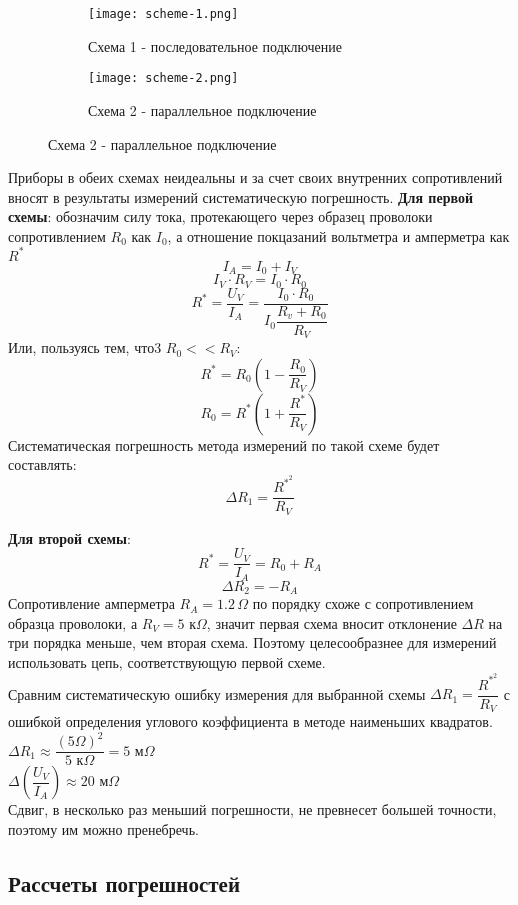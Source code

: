 \documentclass[12pt]{article}
\begin{document}
\begin{thebibliography}
\begin{figure}[H]
\begin{subfigure}{0.4\textwidth}
    \texttt{[image: scheme-1.png]}
    \large
    
    \caption*{Схема 1 - последовательное подключение}
    \label{fig: Схема 1}
    \end{subfigure}
    \begin{subfigure}{0.37\textwidth}
    \centering
    \texttt{[image: scheme-2.png]}
    \large
    \caption*{Схема 2 - параллельное подключение}
    \label{fig: Схема 2}
    \end{subfigure}
\end{figure}

Приборы в обеих схемах неидеальны и за счет своих внутренних сопротивлений вносят в результаты измерений систематическую погрешность. 
\textbf{Для первой схемы}: обозначим силу тока, протекающего через образец проволоки сопротивлением $R_0$ как $I_0$, а отношение покцазаний вольтметра и амперметра как $R^*$
$$ I_A = I_0 + I_V $$
$$ I_V \cdot R_V = I_0 \cdot R_0 $$
$$ R^* = \dfrac{U_V}{I_A} = \dfrac{I_0\cdot R_0}{I_0 \dfrac{R_v + R_0}{R_V}}$$
Или, пользуясь тем, что3 $R_0 << R_V$:
$$ R^* = R_0\left(1 - \dfrac{R_0}{R_V} \right)$$
$$ R_0 = R^*\left(1 + \dfrac{R^*}{R_V}\right)$$
Систематическая погрешность метода измерений по такой схеме будет составлять: $$\Delta R_1 = \dfrac{R^*^2}{R_V}$$

\textbf{Для второй схемы}: 
$$ R^* = \dfrac{U_V}{I_A} = R_0 + R_A$$
$$ \Delta R_2 = -R_A$$
Сопротивление амперметра $R_A = 1.2\, \Omega$ по порядку схоже с сопротивлением образца проволоки, а $R_V = 5$ к$\Omega$, значит первая схема вносит отклонение $\Delta R$ на три порядка меньше, чем вторая схема. Поэтому целесообразнее для измерений использовать цепь, соответствующую первой схеме. \\
\label{sec: negligence}
Сравним систематическую ошибку измерения для выбранной схемы $\Delta R_1 = \dfrac{R^*^2}{R_V}$ с ошибкой определения углового коэффициента в методе наименьших квадратов.\\
$\Delta R_1 \approx \dfrac{(5\Omega)^2}{5\text{ к}\Omega} = 5 \text{ м}\Omega$\\
$\Delta \left(\dfrac{U_V}{I_A}\right) \approx 20 \text{ м}\Omega$ \\
Сдвиг, в несколько раз меньший погрешности, не превнесет большей точности, поэтому им можно пренебречь.

\subsection*{Рассчеты погрешностей}

\end{thebibliography}
\end{document}
